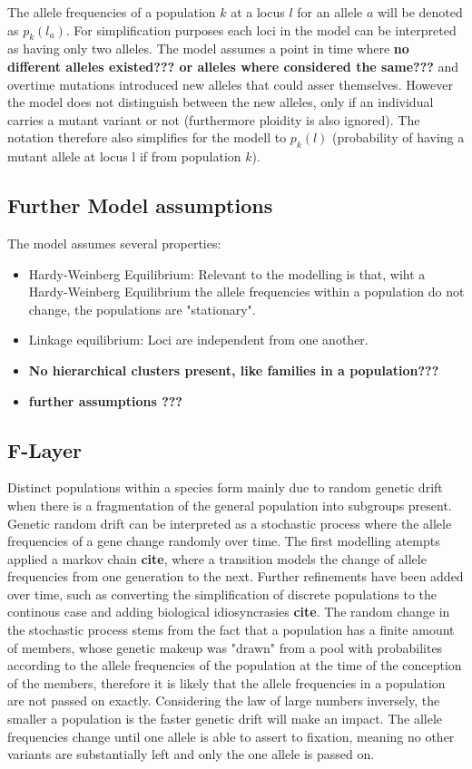 \documentclass[a4paper, 11pt]{article}
\begin{document}
The allele frequencies of a population $k$ at a locus $l$ for an allele $a$ will be denoted as $p_k(l_a)$. For simplification purposes each loci in the model can be interpreted as having only two alleles. The model assumes a point in time where \textbf{no different alleles existed??? or alleles where considered the same???} and overtime mutations introduced new alleles that could asser themselves. However the model does not distinguish between the new alleles, only if an individual carries a mutant variant or not (furthermore ploidity is also ignored). The notation therefore also simplifies for the modell to $p_k(l)$ (probability of having a mutant allele at locus l if from population $k$).

\subsection{Further Model assumptions}
The model assumes several properties:
\begin{itemize}
\item Hardy-Weinberg Equilibrium: Relevant to the modelling is that, wiht a Hardy-Weinberg Equilibrium the allele frequencies within a population do not change, the populations are "stationary".

\item Linkage equilibrium: Loci are independent from one another.

\item \textbf{No hierarchical clusters present, like families in a population???}

\item \textbf{further assumptions ???}
\end{itemize}

\subsection{F-Layer}
Distinct populations within a species form mainly due to random genetic drift when there is a fragmentation of the general population into subgroups present. Genetic random drift can be interpreted as a stochastic process where the allele frequencies of a gene change randomly over time. The first modelling atempts applied a markov chain \textbf{cite}, where a transition models the change of allele frequencies from one generation to the next. Further refinements have been added over time, such as converting the simplification of discrete populations to the continous case and adding biological idiosyncrasies \textbf{cite}. The random change in the stochastic process stems from the fact that a population has a finite amount of members, whose genetic makeup was "drawn" from a pool with probabilites according to the allele frequencies of the population at the time of the conception of the members, therefore it is likely that the allele frequencies in a population are not passed on exactly. Considering the law of large numbers inversely, the smaller a population is the faster genetic drift will make an impact. The allele frequencies change until one allele is able to assert to fixation, meaning no other variants are substantially left and only the one allele is passed on. \\
\end{document}
